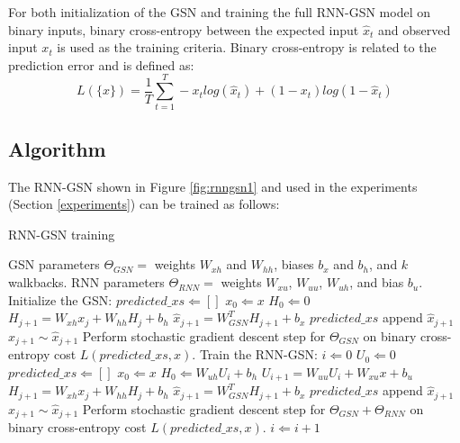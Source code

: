 For both initialization of the GSN and training the full RNN-GSN model on binary inputs, binary cross-entropy between the expected input $\hat{x}_t$ and observed input $x_t$ is used as the training criteria. Binary cross-entropy is related to the prediction error and is defined as:
\begin{equation}
L(\{x\}) = \frac{1}{T} \sum\limits_{t=1}^T -x_t log(\hat{x}_t) + (1-x_t) log(1-\hat{x}_t)
 \end{equation} 

\subsection{Algorithm}
The RNN-GSN shown in Figure \ref{fig:rnngsn1} and used in the experiments (Section \ref{experiments}) can be trained as follows:
\begin{algorithm}
\caption{RNN-GSN training}
\begin{algorithmic}
	\STATE GSN parameters $\Theta_{GSN} =$ weights $W_{xh}$ and $W_{hh}$, biases $b_x$ and $b_h$, and $k$ walkbacks.
	\STATE RNN parameters $\Theta_{RNN} =$ weights $W_{xu}$, $W_{uu}$, $W_{uh}$, and bias $b_u$.
	\STATE Initialize the GSN:
		\STATE $predicted\_xs \Leftarrow []$
		\STATE $x_0 \Leftarrow x$
		\STATE $H_0 \Leftarrow 0$
			\STATE $H_{j+1} = W_{xh}x_j + W_{hh}H_{j} + b_h$
			\STATE $\hat{x}_{j+1} = W_{GSN}^T H_{j+1} + b_x$
			\STATE $predicted\_xs$ append $\hat{x}_{j+1}$
			\STATE $x_{j+1}\sim \hat{x}_{j+1}$
		\ENDFOR
		\STATE Perform stochastic gradient descent step for $\Theta_{GSN}$ on binary cross-entropy cost $L(predicted\_xs, x)$.
	\ENDFOR
	\STATE Train the RNN-GSN:
	\STATE $i \Leftarrow 0$
	\STATE $U_0 \Leftarrow 0$
		\STATE $predicted\_xs \Leftarrow []$
		\STATE $x_0 \Leftarrow x$
		\STATE $H_0 \Leftarrow W_{uh}U_i + b_h$
		\STATE $U_{i+1} = W_{uu}U_i + W_{xu}x + b_u$
			\STATE $H_{j+1} = W_{xh}x_j + W_{hh}H_{j} + b_h$
			\STATE $\hat{x}_{j+1} = W_{GSN}^T H_{j+1} + b_x$
			\STATE $predicted\_xs$ append $\hat{x}_{j+1}$
			\STATE $x_{j+1}\sim \hat{x}_{j+1}$
		\ENDFOR
		\STATE Perform stochastic gradient descent step for $\Theta_{GSN} + \Theta_{RNN}$ on binary cross-entropy cost $L(predicted\_xs, x)$.
		\STATE $i \Leftarrow i+1$
	\ENDFOR
\end{algorithmic}
\end{algorithm}

